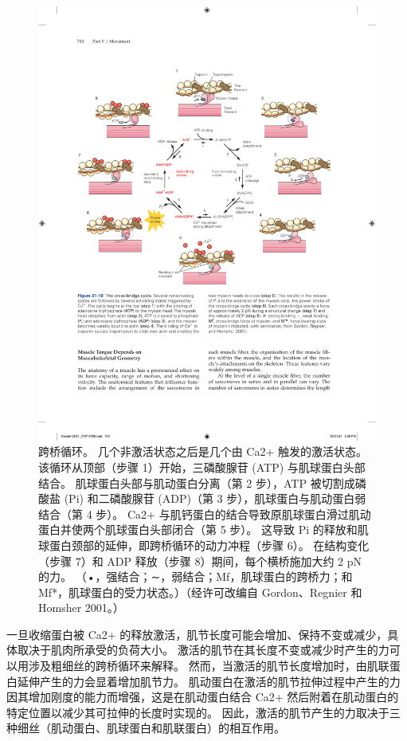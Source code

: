 \begin{figure}[htbp]
	\centering
	\includegraphics[width=0.9\linewidth]{chap31/fig_31_10}
	\caption{跨桥循环。 几个非激活状态之后是几个由 Ca2+ 触发的激活状态。 该循环从顶部（步骤 1）开始，三磷酸腺苷 (ATP) 与肌球蛋白头部结合。 肌球蛋白头部与肌动蛋白分离（第 2 步），ATP 被切割成磷酸盐 (Pi) 和二磷酸腺苷 (ADP)（第 3 步），肌球蛋白与肌动蛋白弱结合（第 4 步）。 Ca2+ 与肌钙蛋白的结合导致原肌球蛋白滑过肌动蛋白并使两个肌球蛋白头部闭合（第 5 步）。 这导致 Pi 的释放和肌球蛋白颈部的延伸，即跨桥循环的动力冲程（步骤 6）。 在结构变化（步骤 7）和 ADP 释放（步骤 8）期间，每个横桥施加大约 2 pN 的力。 （•，强结合；∼，弱结合；Mf，肌球蛋白的跨桥力；和 Mf*，肌球蛋白的受力状态。）（经许可改编自 Gordon、Regnier 和 Homsher 2001。）}
	\label{fig:31_10}
\end{figure}

一旦收缩蛋白被 Ca2+ 的释放激活，肌节长度可能会增加、保持不变或减少，具体取决于肌肉所承受的负荷大小。 激活的肌节在其长度不变或减少时产生的力可以用涉及粗细丝的跨桥循环来解释。 然而，当激活的肌节长度增加时，由肌联蛋白延伸产生的力会显着增加肌节力。 肌动蛋白在激活的肌节拉伸过程中产生的力因其增加刚度的能力而增强，这是在肌动蛋白结合 Ca2+ 然后附着在肌动蛋白的特定位置以减少其可拉伸的长度时实现的。 因此，激活的肌节产生的力取决于三种细丝（肌动蛋白、肌球蛋白和肌联蛋白）的相互作用。

